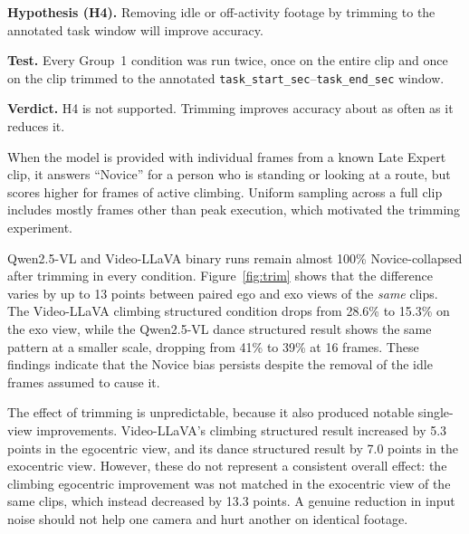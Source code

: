 \documentclass[logo,msc]{infthesis}
\newcommand{\runin}[1]{\par\medskip\noindent\textbf{#1}}
\begin{document}
\runin{Hypothesis (H4).} Removing idle or off-activity footage by
trimming to the annotated task window will improve accuracy.

\runin{Test.} Every Group~1 condition was run twice, once on the entire
clip and once on the clip trimmed to the annotated
\texttt{task\_start\_sec}--\texttt{task\_end\_sec} window.

\runin{Verdict.} H4 is not supported. Trimming improves accuracy about
as often as it reduces it.

When the model is provided with individual frames from a known Late Expert
clip, it answers ``Novice'' for a person who is standing or looking at a
route, but scores higher for frames of active climbing. Uniform sampling
across a full clip includes mostly frames other than peak execution, which
motivated the trimming experiment.

Qwen2.5-VL and Video-LLaVA binary runs remain almost 100\% Novice-collapsed
after trimming in every condition. Figure~\ref{fig:trim} shows that the
difference varies by up to 13 points between paired ego and exo views
of the \emph{same} clips. The Video-LLaVA climbing structured condition
drops from 28.6\% to 15.3\% on the exo view, while the Qwen2.5-VL
dance structured result shows the same pattern at a smaller scale, dropping
from 41\% to 39\% at 16 frames. These findings indicate that the Novice
bias persists despite the removal of the idle frames assumed to cause it.

The effect of trimming is unpredictable, because it also produced notable
single-view improvements. Video-LLaVA's climbing structured result
increased by 5.3 points in the egocentric view, and its dance structured
result by 7.0 points in the exocentric view. However, these do not
represent a consistent overall effect: the climbing egocentric improvement
was not matched in the exocentric view of the same clips, which instead
decreased by 13.3 points. A genuine reduction in input noise should not
help one camera and hurt another on identical footage.
\end{document}
